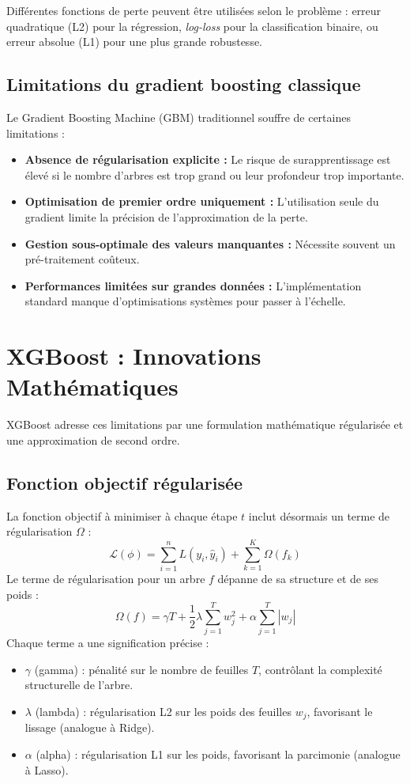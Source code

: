 Différentes fonctions de perte peuvent être utilisées selon le problème : erreur quadratique (L2) pour la régression, \textit{log-loss} pour la classification binaire, ou erreur absolue (L1) pour une plus grande robustesse.

\subsection{Limitations du gradient boosting classique}
Le Gradient Boosting Machine (GBM) traditionnel souffre de certaines limitations :
\begin{itemize}
    \item \textbf{Absence de régularisation explicite :} Le risque de surapprentissage est élevé si le nombre d'arbres est trop grand ou leur profondeur trop importante.
    \item \textbf{Optimisation de premier ordre uniquement :} L'utilisation seule du gradient limite la précision de l'approximation de la perte.
    \item \textbf{Gestion sous-optimale des valeurs manquantes :} Nécessite souvent un pré-traitement coûteux.
    \item \textbf{Performances limitées sur grandes données :} L'implémentation standard manque d'optimisations systèmes pour passer à l'échelle.
\end{itemize}



\section{XGBoost : Innovations Mathématiques}
XGBoost adresse ces limitations par une formulation mathématique régularisée et une approximation de second ordre.

\subsection{Fonction objectif régularisée}
La fonction objectif à minimiser à chaque étape $t$ inclut désormais un terme de régularisation $\Omega$ :
\begin{equation}
    \mathcal{L}(\phi) = \sum_{i=1}^n L(y_i, \hat{y}_i) + \sum_{k=1}^K \Omega(f_k)
\end{equation}
Le terme de régularisation pour un arbre $f$ dépanne de sa structure et de ses poids :
\begin{equation}
    \Omega(f) = \gamma T + \frac{1}{2}\lambda \sum_{j=1}^{T} w_j^2 + \alpha \sum_{j=1}^{T} |w_j|
\end{equation}
Chaque terme a une signification précise :
\begin{itemize}
    \item $\gamma$ (gamma) : pénalité sur le nombre de feuilles $T$, contrôlant la complexité structurelle de l'arbre.
    \item $\lambda$ (lambda) : régularisation L2 sur les poids des feuilles $w_j$, favorisant le lissage (analogue à Ridge).
    \item $\alpha$ (alpha) : régularisation L1 sur les poids, favorisant la parcimonie (analogue à Lasso).
\end{itemize}

